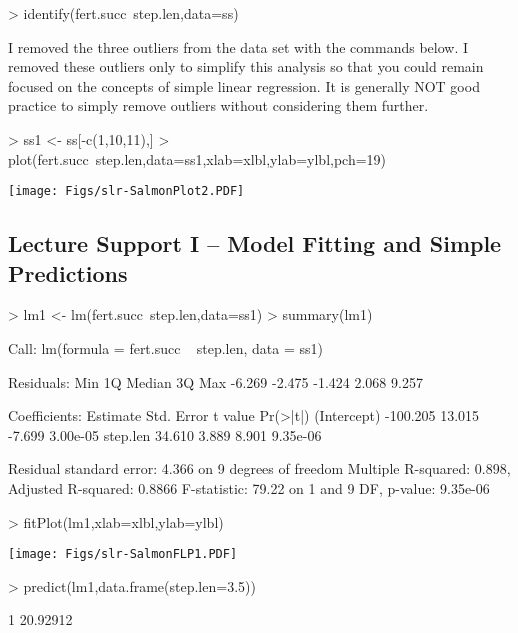 \documentclass[a4paper]{article}
\begin{document}
\begin{Schunk}
\begin{Sinput}
> identify(fert.succ~step.len,data=ss)
\end{Sinput}
\end{Schunk}

I removed the three outliers from the data set with the commands below.  I removed these outliers only to simplify this analysis so that you could remain focused on the concepts of simple linear regression.  It is generally NOT good practice to simply remove outliers without considering them further.

\begin{Schunk}
\begin{Sinput}
> ss1 <- ss[-c(1,10,11),]
> plot(fert.succ~step.len,data=ss1,xlab=xlbl,ylab=ylbl,pch=19)
\end{Sinput}
\end{Schunk}
\texttt{[image: Figs/slr-SalmonPlot2.PDF]}
 
\subsection{Lecture Support I -- Model Fitting and Simple Predictions}
\begin{Schunk}
\begin{Sinput}
> lm1 <- lm(fert.succ~step.len,data=ss1)
> summary(lm1)
\end{Sinput}
\begin{Soutput}
Call:
lm(formula = fert.succ ~ step.len, data = ss1)

Residuals:
   Min     1Q Median     3Q    Max 
-6.269 -2.475 -1.424  2.068  9.257 

Coefficients:
            Estimate Std. Error t value Pr(>|t|)
(Intercept) -100.205     13.015  -7.699 3.00e-05
step.len      34.610      3.889   8.901 9.35e-06

Residual standard error: 4.366 on 9 degrees of freedom
Multiple R-squared: 0.898,	Adjusted R-squared: 0.8866 
F-statistic: 79.22 on 1 and 9 DF,  p-value: 9.35e-06 
\end{Soutput}
\begin{Sinput}
> fitPlot(lm1,xlab=xlbl,ylab=ylbl)
\end{Sinput}
\end{Schunk}
\texttt{[image: Figs/slr-SalmonFLP1.PDF]}

\begin{Schunk}
\begin{Sinput}
> predict(lm1,data.frame(step.len=3.5))
\end{Sinput}
\begin{Soutput}
       1 
20.92912 
\end{Soutput}
\end{Schunk}
\end{document}
